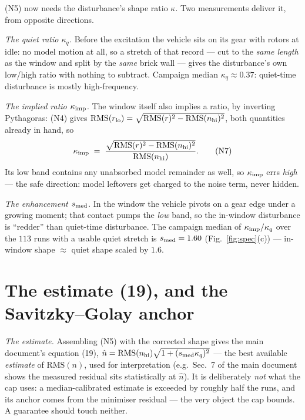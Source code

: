 \documentclass[10pt]{article}
\newcommand{\rms}{\mathrm{RMS}}
\begin{document}
(N5) now needs the disturbance's shape ratio $\kappa$. Two
measurements deliver it, from opposite directions.

\emph{The quiet ratio $\kappa_q$.} Before the excitation the vehicle
sits on its gear with rotors at idle: no model motion at all, so a
stretch of that record --- cut to the \emph{same length} as the
window and split by the \emph{same} brick wall --- gives the
disturbance's own low/high ratio with nothing to subtract. Campaign
median $\kappa_q \approx 0.37$: quiet-time disturbance is mostly
high-frequency.

\emph{The implied ratio $\kappa_{\rm imp}$.} The window itself also
implies a ratio, by inverting Pythagoras: (N4) gives
$\rms(r_{\rm lo}) = \sqrt{\rms(r)^2 - \rms(n_{\rm hi})^2}$, both
quantities already in hand, so
\begin{equation}
  \kappa_{\rm imp}
  \;=\; \frac{\sqrt{\rms(r)^2 - \rms(n_{\rm hi})^2}}{\rms(n_{\rm hi})}.
  \tag{N7}
\end{equation}
Its low band contains any unabsorbed model remainder as well, so
$\kappa_{\rm imp}$ errs \emph{high} --- the safe direction: model
leftovers get charged to the noise term, never hidden.

\emph{The enhancement $s_{\rm med}$.} In the window the vehicle
pivots on a gear edge under a growing moment; that contact pumps the
\emph{low} band, so the in-window disturbance is ``redder'' than
quiet-time disturbance. The campaign median of
$\kappa_{\rm imp}/\kappa_q$ over the $113$ runs with a usable quiet
stretch is $s_{\rm med} = 1.60$
(Fig.~\ref{fig:spec}(c)) --- in-window shape $\approx$ quiet shape
scaled by $1.6$.

\section{The estimate (19), and the Savitzky--Golay anchor}

\emph{The estimate.} Assembling (N5) with the corrected shape gives
the main document's equation (19),
$\hat n = \rms(n_{\rm hi})\sqrt{1+(s_{\rm med}\kappa_q)^2}$ --- the
best available \emph{estimate} of $\rms(n)$, used for interpretation
(e.g.\ Sec.~7 of the main document shows the measured residual sits
statistically at $\hat n$). It is deliberately \emph{not} what the
cap uses: a median-calibrated estimate is exceeded by roughly half
the runs, and its anchor comes from the minimiser residual --- the
very object the cap bounds. A guarantee should touch neither.
\end{document}
